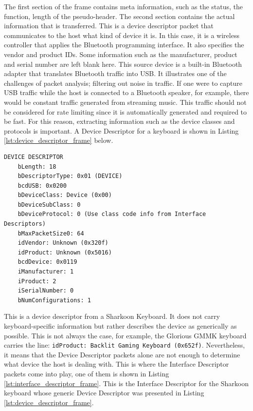 The first section of the frame contains meta information, such as the status, the function, length of the pseudo-header. The second section contains the actual information that is transferred.
This is a device descriptor packet that communicates to the host what kind of device it is. In this case, it is a wireless controller that applies the Bluetooth programming interface. It also specifies the
vendor and product IDs. Some information such as the manufacturer, product and serial number are left blank here.
This source device is a built-in Bluetooth adapter that translates Bluetooth traffic into USB. It illustrates one of the challenges of packet analysis; filtering out noise in traffic. If one were to capture USB traffic while the host is connected to a Bluetooth
speaker, for example, there would be constant traffic generated from streaming music. This traffic should not be considered for rate limiting since it is automatically generated and required to be fast.
For this reason, extracting information such as the device classes and protocols is important. A Device Descriptor for a keyboard is shown in Listing \ref{lst:device_descriptor_frame} below. 


\begin{lstlisting}[caption={Device Descriptor packet generated by an external keyboard},label={lst:device_descriptor_frame}, captionpos=b]
DEVICE DESCRIPTOR
    bLength: 18
    bDescriptorType: 0x01 (DEVICE)
    bcdUSB: 0x0200
    bDeviceClass: Device (0x00)
    bDeviceSubClass: 0
    bDeviceProtocol: 0 (Use class code info from Interface Descriptors)
    bMaxPacketSize0: 64
    idVendor: Unknown (0x320f)
    idProduct: Unknown (0x5016)
    bcdDevice: 0x0119
    iManufacturer: 1
    iProduct: 2
    iSerialNumber: 0
    bNumConfigurations: 1
\end{lstlisting}


This is a device descriptor from a Sharkoon Keyboard. It does not carry keyboard-specific information but rather describes the device as generically as possible. This is not always the case, for example, the Glorious GMMK keyboard carries the line: \verb|idProduct: Backlit Gaming Keyboard (0x652f)|. Nevertheless,
it means that the Device Descriptor packets alone are not enough to determine what device the host is dealing with. This is where the Interface Descriptor packets come into play, one of them is shown in Listing \ref{lst:interface_descriptor_frame}.
This is the Interface Descriptor for the Sharkoon keyboard whose generic Device Descriptor was presented in Listing \ref{lst:device_descriptor_frame}.

